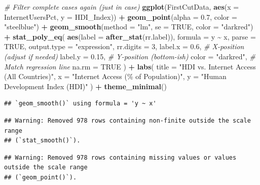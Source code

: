 \documentclass[
]{article}
\newenvironment{Shaded}{\begin{snugshade}}{\end{snugshade}}
\newcommand{\AttributeTok}[1]{\textcolor[rgb]{0.13,0.29,0.53}{#1}}
\newcommand{\CommentTok}[1]{\textcolor[rgb]{0.56,0.35,0.01}{\textit{#1}}}
\newcommand{\ConstantTok}[1]{\textcolor[rgb]{0.56,0.35,0.01}{#1}}
\newcommand{\DecValTok}[1]{\textcolor[rgb]{0.00,0.00,0.81}{#1}}
\newcommand{\FloatTok}[1]{\textcolor[rgb]{0.00,0.00,0.81}{#1}}
\newcommand{\FunctionTok}[1]{\textcolor[rgb]{0.13,0.29,0.53}{\textbf{#1}}}
\newcommand{\NormalTok}[1]{#1}
\newcommand{\SpecialCharTok}[1]{\textcolor[rgb]{0.81,0.36,0.00}{\textbf{#1}}}
\newcommand{\StringTok}[1]{\textcolor[rgb]{0.31,0.60,0.02}{#1}}
\begin{document}
\begin{Shaded}
\begin{Highlighting}[]
\CommentTok{\# Filter complete cases again (just in case)}
\FunctionTok{ggplot}\NormalTok{(FirstCutData, }\FunctionTok{aes}\NormalTok{(}\AttributeTok{x =}\NormalTok{ InternetUsersPct, }\AttributeTok{y =}\NormalTok{ HDI\_Index)) }\SpecialCharTok{+}
  \FunctionTok{geom\_point}\NormalTok{(}\AttributeTok{alpha =} \FloatTok{0.7}\NormalTok{, }\AttributeTok{color =} \StringTok{"steelblue"}\NormalTok{) }\SpecialCharTok{+}
  \FunctionTok{geom\_smooth}\NormalTok{(}\AttributeTok{method =} \StringTok{"lm"}\NormalTok{, }\AttributeTok{se =} \ConstantTok{TRUE}\NormalTok{, }\AttributeTok{color =} \StringTok{"darkred"}\NormalTok{) }\SpecialCharTok{+}
  \FunctionTok{stat\_poly\_eq}\NormalTok{(}
    \FunctionTok{aes}\NormalTok{(}\AttributeTok{label =} \FunctionTok{after\_stat}\NormalTok{(rr.label)),}
    \AttributeTok{formula =}\NormalTok{ y }\SpecialCharTok{\textasciitilde{}}\NormalTok{ x,}
    \AttributeTok{parse =} \ConstantTok{TRUE}\NormalTok{,}
    \AttributeTok{output.type =} \StringTok{"expression"}\NormalTok{,}
    \AttributeTok{rr.digits =} \DecValTok{3}\NormalTok{,}
    \AttributeTok{label.x =} \FloatTok{0.6}\NormalTok{,           }\CommentTok{\# X{-}position (adjust if needed)}
    \AttributeTok{label.y =} \FloatTok{0.15}\NormalTok{,         }\CommentTok{\# Y{-}position (bottom{-}ish)}
    \AttributeTok{color =} \StringTok{"darkred"}\NormalTok{,      }\CommentTok{\# Match regression line}
    \AttributeTok{na.rm =} \ConstantTok{TRUE}
\NormalTok{  ) }\SpecialCharTok{+}
  \FunctionTok{labs}\NormalTok{(}
    \AttributeTok{title =} \StringTok{"HDI vs. Internet Access (All Countries)"}\NormalTok{,}
    \AttributeTok{x =} \StringTok{"Internet Access (\% of Population)"}\NormalTok{,}
    \AttributeTok{y =} \StringTok{"Human Development Index (HDI)"}
\NormalTok{  ) }\SpecialCharTok{+}
  \FunctionTok{theme\_minimal}\NormalTok{()}
\end{Highlighting}
\end{Shaded}

\begin{verbatim}
## `geom_smooth()` using formula = 'y ~ x'
\end{verbatim}

\begin{verbatim}
## Warning: Removed 978 rows containing non-finite outside the scale range
## (`stat_smooth()`).
\end{verbatim}

\begin{verbatim}
## Warning: Removed 978 rows containing missing values or values outside the scale range
## (`geom_point()`).
\end{verbatim}
\end{document}
